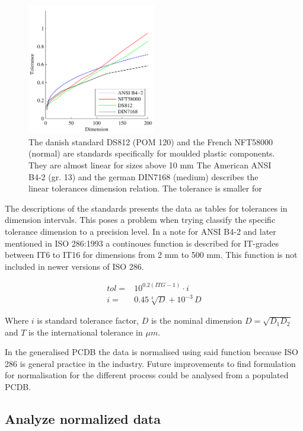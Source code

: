 \documentclass[aip,amsmath, reprint, author-year]{revtex4-1}
\begin{document}
\begin{figure}
\includegraphics[width=0.5\textwidth]{Tolerance_standards.pdf}
\caption{\label{fig:tolstd} The danish standard DS812 (POM 120) and the French NFT58000 (normal) are standards specifically for moulded plastic components. They are almost linear for sizes above 10 mm The American ANSI B4-2 (gr. 13) and the german DIN7168 (medium) describes the linear tolerances dimension relation. The tolerance is smaller for }
\end{figure}

The descriptions of the standards presents the data as tables for tolerances in dimension intervals. This poses a problem when trying classify the specific tolerance dimension to a precision level.
In a note for ANSI B4-2  and later mentioned in ISO 286:1993 a continoues function is described for IT-grades between IT6 to IT16 for dimensions from 2 mm to 500 mm. This function is not included in newer versions of ISO 286.

\begin{align}
	tol =& 10^{0.2 (ITG -1)} \cdot i \\
	i =& 0.45 \sqrt[3]{D} + 10^{-3} \, D 
\end{align}

Where $i$ is standard tolerance factor, $D$ is the nominal dimension $D = \sqrt{D_1 D_2}$ and $T$ is the international tolerance in $\mu m$.

In the generalised PCDB the data is normalised using said function because ISO 286 is general practice in the industry. Future improvements to find formulation for normalisation for the different process could be analysed from a populated PCDB.

\subsection{Analyze normalized data}
\end{document}
